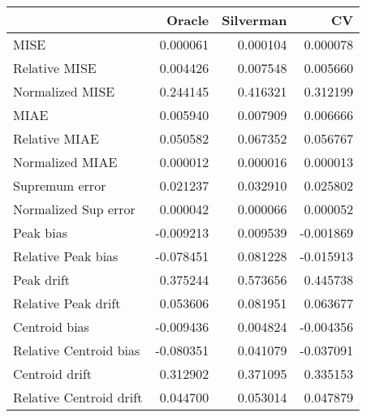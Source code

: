 \begin{tabular}{lrrr}
  \toprule
 & Oracle & Silverman & CV \\ 
  \midrule
MISE & 0.000061 & 0.000104 & 0.000078 \\ 
  Relative MISE & 0.004426 & 0.007548 & 0.005660 \\ 
  Normalized MISE & 0.244145 & 0.416321 & 0.312199 \\ 
  MIAE & 0.005940 & 0.007909 & 0.006666 \\ 
  Relative MIAE & 0.050582 & 0.067352 & 0.056767 \\ 
  Normalized MIAE & 0.000012 & 0.000016 & 0.000013 \\ 
  Supremum error & 0.021237 & 0.032910 & 0.025802 \\ 
  Normalized Sup error & 0.000042 & 0.000066 & 0.000052 \\ 
  Peak bias & -0.009213 & 0.009539 & -0.001869 \\ 
  Relative Peak bias & -0.078451 & 0.081228 & -0.015913 \\ 
  Peak drift & 0.375244 & 0.573656 & 0.445738 \\ 
  Relative Peak drift & 0.053606 & 0.081951 & 0.063677 \\ 
  Centroid bias & -0.009436 & 0.004824 & -0.004356 \\ 
  Relative Centroid bias & -0.080351 & 0.041079 & -0.037091 \\ 
  Centroid drift & 0.312902 & 0.371095 & 0.335153 \\ 
  Relative Centroid drift & 0.044700 & 0.053014 & 0.047879 \\ 
   \bottomrule
\end{tabular}
